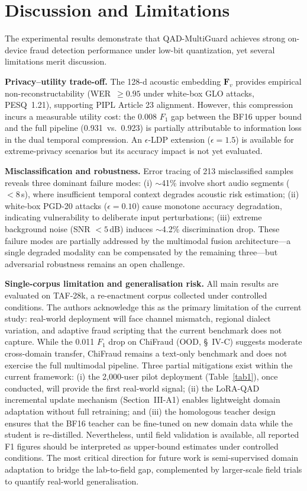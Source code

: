 \documentclass[final,5p,times,number]{elsarticle}
\begin{document}
\section{Discussion and Limitations}

The experimental results demonstrate that QAD-MultiGuard achieves strong on-device fraud detection performance under low-bit quantization, yet several limitations merit discussion.

\textbf{Privacy--utility trade-off.} The 128-d acoustic embedding $\bm{F}_v$ provides empirical non-reconstructability (WER~$\ge 0.95$ under white-box GLO attacks, PESQ~1.21), supporting PIPL Article 23 alignment. However, this compression incurs a measurable utility cost: the 0.008 $F_1$ gap between the BF16 upper bound and the full pipeline (0.931~vs.~0.923) is partially attributable to information loss in the dual temporal compression. An $\epsilon$-LDP extension ($\epsilon=1.5$) is available for extreme-privacy scenarios but its accuracy impact is not yet evaluated.

\textbf{Misclassification and robustness.} Error tracing of 213 misclassified samples reveals three dominant failure modes: (i) $\sim$41\% involve short audio segments ($<8$\,s), where insufficient temporal context degrades acoustic risk estimation; (ii) white-box PGD-20 attacks ($\epsilon=0.10$) cause monotone accuracy degradation, indicating vulnerability to deliberate input perturbations; (iii) extreme background noise (SNR $<5$\,dB) induces $\sim$4.2\% discrimination drop. These failure modes are partially addressed by the multimodal fusion architecture---a single degraded modality can be compensated by the remaining three---but adversarial robustness remains an open challenge.

\textbf{Single-corpus limitation and generalisation risk.} All main results are evaluated on TAF-28k, a re-enactment corpus collected under controlled conditions. The authors acknowledge this as the primary limitation of the current study: real-world deployment will face channel mismatch, regional dialect variation, and adaptive fraud scripting that the current benchmark does not capture. While the 0.011 $F_1$ drop on ChiFraud (OOD, \S~IV-C) suggests moderate cross-domain transfer, ChiFraud remains a text-only benchmark and does not exercise the full multimodal pipeline. Three partial mitigations exist within the current framework: (i) the 2{,}000-user pilot deployment (Table~\ref{tab1}), once conducted, will provide the first real-world signal; (ii) the LoRA-QAD incremental update mechanism (Section~III-A1) enables lightweight domain adaptation without full retraining; and (iii) the homologous teacher design ensures that the BF16 teacher can be fine-tuned on new domain data while the student is re-distilled. Nevertheless, until field validation is available, all reported F1 figures should be interpreted as upper-bound estimates under controlled conditions. The most critical direction for future work is semi-supervised domain adaptation to bridge the lab-to-field gap, complemented by larger-scale field trials to quantify real-world generalisation.
\end{document}
